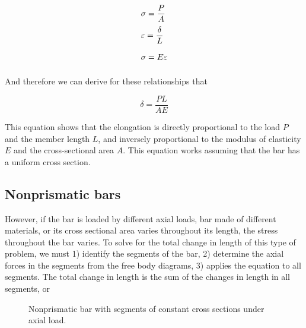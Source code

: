 \documentclass[
10pt,
a4paper,
openany,
svgnames,
]{book}
\begin{document}
\[\arraycolsep=1.4pt\def\arraystretch{2.2}
  \begin{array}{l}
    \sigma  = \dfrac{P}{A}\\
    \varepsilon  = \dfrac{\delta }{L}\\
    \sigma  = E\varepsilon 
  \end{array}\]

And therefore we can derive for these relationships that

\begin{equation}
  \delta  = \frac{PL}{AE}
\end{equation}

This equation shows that the elongation is directly proportional to the load $P$ and the member length $L$, and inversely proportional to the modulus of elasticity $E$ and the cross-sectional area $A$. This equation works assuming that the bar has a uniform cross section.

\subsection{Nonprismatic bars}

However, if the bar is loaded by different axial loads, bar made of different materials, or its cross sectional area varies throughout its length, the stress throughout the bar varies. To solve for the total change in length of this type of problem, we must 1) identify the segments of the bar, 2) determine the axial forces in the segments from the free body diagrams, 3) applies the equation to all segments. The total change in length is the sum of the changes in length in all segments, or

\begin{figure}[h]
  \centering
  \caption{Nonprismatic bar with segments of constant cross sections under axial load.}
\end{figure}
\end{document}
